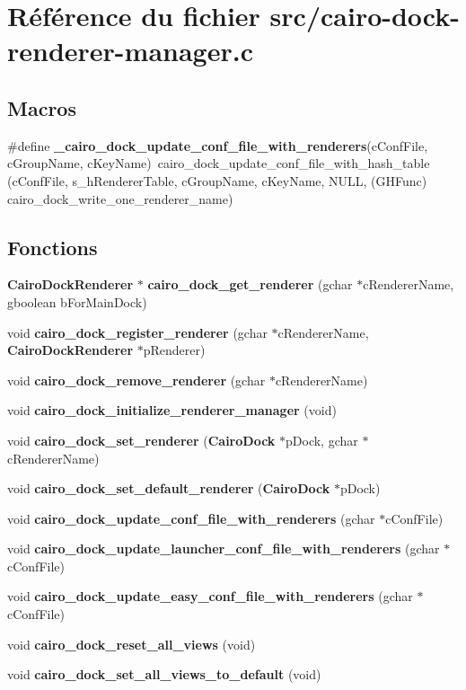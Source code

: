 \section{R\'{e}f\'{e}rence du fichier src/cairo-dock-renderer-manager.c}
\label{cairo-dock-renderer-manager_8c}
\subsection*{Macros}
\begin{CompactItemize}
\item 
\#define {\bf \_\-cairo\_\-dock\_\-update\_\-conf\_\-file\_\-with\_\-renderers}(c\-Conf\-File, c\-Group\-Name, c\-Key\-Name)~cairo\_\-dock\_\-update\_\-conf\_\-file\_\-with\_\-hash\_\-table (c\-Conf\-File, s\_\-h\-Renderer\-Table, c\-Group\-Name, c\-Key\-Name, NULL, (GHFunc) cairo\_\-dock\_\-write\_\-one\_\-renderer\_\-name)
\end{CompactItemize}
\subsection*{Fonctions}
\begin{CompactItemize}
\item 
{\bf Cairo\-Dock\-Renderer} $\ast$ {\bf cairo\_\-dock\_\-get\_\-renderer} (gchar $\ast$c\-Renderer\-Name, gboolean b\-For\-Main\-Dock)
\item 
void {\bf cairo\_\-dock\_\-register\_\-renderer} (gchar $\ast$c\-Renderer\-Name, {\bf Cairo\-Dock\-Renderer} $\ast$p\-Renderer)
\item 
void {\bf cairo\_\-dock\_\-remove\_\-renderer} (gchar $\ast$c\-Renderer\-Name)
\item 
void {\bf cairo\_\-dock\_\-initialize\_\-renderer\_\-manager} (void)
\item 
void {\bf cairo\_\-dock\_\-set\_\-renderer} ({\bf Cairo\-Dock} $\ast$p\-Dock, gchar $\ast$c\-Renderer\-Name)
\item 
void {\bf cairo\_\-dock\_\-set\_\-default\_\-renderer} ({\bf Cairo\-Dock} $\ast$p\-Dock)
\item 
void {\bf cairo\_\-dock\_\-update\_\-conf\_\-file\_\-with\_\-renderers} (gchar $\ast$c\-Conf\-File)
\item 
void {\bf cairo\_\-dock\_\-update\_\-launcher\_\-conf\_\-file\_\-with\_\-renderers} (gchar $\ast$c\-Conf\-File)
\item 
void {\bf cairo\_\-dock\_\-update\_\-easy\_\-conf\_\-file\_\-with\_\-renderers} (gchar $\ast$c\-Conf\-File)
\item 
void {\bf cairo\_\-dock\_\-reset\_\-all\_\-views} (void)
\item 
void {\bf cairo\_\-dock\_\-set\_\-all\_\-views\_\-to\_\-default} (void)
\end{CompactItemize}
